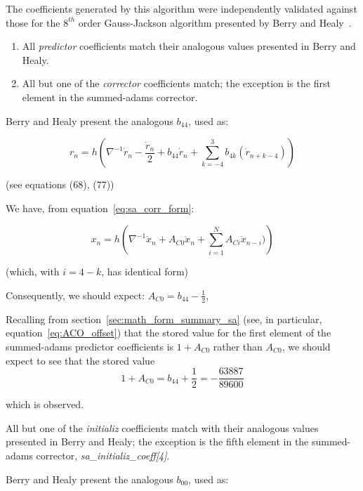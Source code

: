 The coefficients generated by this algorithm were independently validated 
against those for the $8^{th}$ order Gauss-Jackson algorithm presented by Berry 
and Healy~\cite{paper:Berry_Healy}.

\begin{enumerate}
 \item All \textit{predictor} coefficients match their analogous values 
 presented in Berry and Healy.
 \item All but one of the \textit{corrector} coefficients match; the exception 
 is the first element in the summed-adams corrector.
\end{enumerate}

Berry and Healy present the analogous $b_{44}$, used as:

\begin{equation*}
r_{n}=h\left(\nabla 
^{-1}\dot{r}_{n}-\frac{\dot{r}_{n}}{2}+b_{44}\dot{r}_{n}+\sum 
_{k=-4}^{3}b_{4k}(\dot{r}_{n+k-4})\right)
\end{equation*}

(see equations (68), (77))

We have, from equation~\ref{eq:sa_corr_form}:

\begin{equation*}
x_{n}=h\left(\nabla 
^{-1}{\dot{x}}_{n}+A_{\mathit{C0}}{\dot{x}}_{n}+\sum_{i=1}^{N}A_{Ci}{\dot{x}}_{n
-i})\right)
\end{equation*}

(which, with $i=4-k$, has identical form)

Consequently, we should expect:
$A_{\mathit{C0}}=b_{44}-\frac{1}{2}$,

Recalling from section~\ref{sec:math_form_summary_sa} (see, in particular, 
equation~\ref{eq:ACO_offset}) that the stored value for the first element of 
the summed-adams predictor coefficients is $1+A_{C0}$ rather than $A_{C0}$, we 
should expect to see that the stored value
\begin{equation*}
1+A_{\mathit{C0}}=b_{44}+\frac{1}{2} =  -\frac{63887}{89600}
\end{equation*}

which is observed.


All but one of the \textit{initializ} coefficients match with their 
analogous values presented in Berry and Healy; the exception is the fifth 
element in the summed-adams corrector, \textit{sa\_initializ\_coeff[4]}.

Berry and Healy present the analogous $b_{00}$, used as:

